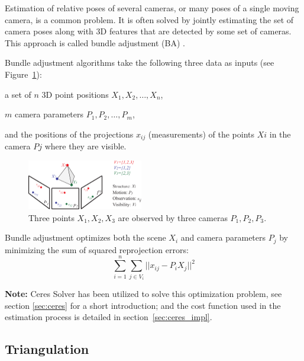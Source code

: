 Estimation of relative poses of several cameras, or many poses of a single moving camera, is a common problem. It is often solved by jointly estimating the set of camera poses along with 3D features that are detected by some set of cameras. This approach is called bundle adjustment (BA) \cite{BA}.

Bundle adjustment algorithms take the following three data as inputs (see Figure~\ref{fig:BA}):
\begin{itemize*}
 \item a set of $n$ 3D point positions $X_1, X_2, \dots, X_n$,
 \item $m$ camera parameters $P_1, P_2, \dots, P_m$,
 \item and the positions of the projections $x_{ij}$ (measurements) of the points $Xi$ in the camera $Pj$ where they are visible.
\end{itemize*}

\begin{figure}[!htbp]
 \centering
 \includegraphics[width=0.45\textwidth]{images/BA.pdf}
 \caption{Three points $X_1, X_2, X_3$ are observed by three cameras $P_1, P_2, P_3$.}
 \label{fig:BA}
\end{figure}

\noindent
Bundle adjustment optimizes both the scene $X_i$ and camera parameters $P_j$ by minimizing the sum of squared reprojection errors:
\begin{equation}
 \sum _{i=1}^{n}\sum _{j\in V_{i}} ||x_{ij}-P_{i}X_{j}||^2
\end{equation}

\noindent
\textbf{Note:} Ceres Solver has been utilized to solve this optimization problem, see section \ref{sec:ceres} for a short introduction; and the cost function used in the estimation process is detailed in section~\ref{sec:ceres_impl}.


\subsection{Triangulation}
\label{sec:triangulation}

